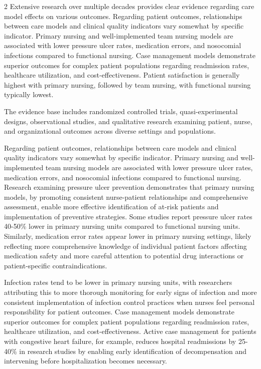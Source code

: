 \documentclass[12pt]{article}
\begin{document}
\begin{multicols}{2}
Extensive research over multiple decades provides clear evidence regarding care model effects on various outcomes. Regarding patient outcomes, relationships between care models and clinical quality indicators vary somewhat by specific indicator. Primary nursing and well-implemented team nursing models are associated with lower pressure ulcer rates, medication errors, and nosocomial infections compared to functional nursing. Case management models demonstrate superior outcomes for complex patient populations regarding readmission rates, healthcare utilization, and cost-effectiveness. Patient satisfaction is generally highest with primary nursing, followed by team nursing, with functional nursing typically lowest.


The evidence base includes randomized controlled trials, quasi-experimental designs, observational studies, and qualitative research examining patient, nurse, and organizational outcomes across diverse settings and populations.

Regarding patient outcomes, relationships between care models and clinical quality indicators vary somewhat by specific indicator. Primary nursing and well-implemented team nursing models are associated with lower pressure ulcer rates, medication errors, and nosocomial infections compared to functional nursing. Research examining pressure ulcer prevention demonstrates that primary nursing models, by promoting consistent nurse-patient relationships and comprehensive assessment, enable more effective identification of at-risk patients and implementation of preventive strategies. Some studies report pressure ulcer rates 40-50\% lower in primary nursing units compared to functional nursing units. Similarly, medication error rates appear lower in primary nursing settings, likely reflecting more comprehensive knowledge of individual patient factors affecting medication safety and more careful attention to potential drug interactions or patient-specific contraindications.

Infection rates tend to be lower in primary nursing units, with researchers attributing this to more thorough monitoring for early signs of infection and more consistent implementation of infection control practices when nurses feel personal responsibility for patient outcomes. Case management models demonstrate superior outcomes for complex patient populations regarding readmission rates, healthcare utilization, and cost-effectiveness. Active case management for patients with congestive heart failure, for example, reduces hospital readmissions by 25-40\% in research studies by enabling early identification of decompensation and intervening before hospitalization becomes necessary.


\end{multicols}
\end{document}
